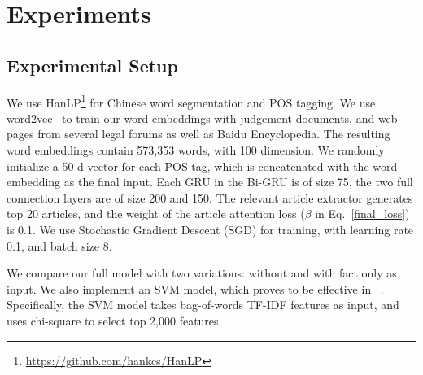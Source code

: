 \section{Experiments}
\subsection{Experimental Setup}
We use HanLP\footnote{\url{https://github.com/hankcs/HanLP}} for Chinese word segmentation and POS tagging. 
We use word2vec~\cite{mikolov2013distributed} to train our word embeddings with judgement documents, and web pages from several legal forums as well as Baidu Encyclopedia. The resulting word embeddings contain  573,353 words, with 100 dimension.  
We randomly initialize a 50-d vector for each POS tag, which is concatenated with the word embedding as the final input.
Each GRU in the Bi-GRU is of size 75, the two full connection layers are of size 200 and 150.
The relevant article extractor generates top 20 articles, and the weight of the article attention loss ($\beta$ in Eq.~\ref{final_loss}) is 0.1. 
We use Stochastic Gradient Descent (SGD) for training, with learning rate 0.1, and batch size 8.

We compare our full model with two variations: without  and with fact only as input. We also implement an SVM model, which proves to be effective in ~\cite{wang2012baselines,aletras2016predicting}. Specifically, the SVM model takes bag-of-words TF-IDF features as input, and uses chi-square to select top 2,000 features.


